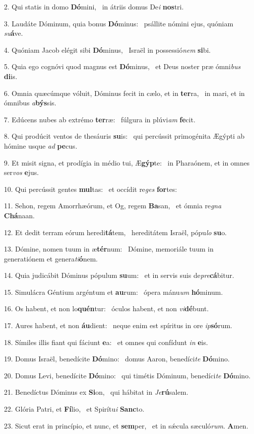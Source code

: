 2. Qui statis in domo \textbf{Dó}mini, \ast\  in átriis domus De\textit{i} \textbf{nos}tri.\

3. Laudáte Dóminum, quia bonus \textbf{Dó}minus: \ast\  psállite nómini ejus, quóniam \textit{su}\textbf{á}ve.\

4. Quóniam Jacob elégit sibi \textbf{Dó}minus, \ast\  Israël in possessió\textit{nem} \textbf{si}bi.\

5. Quia ego cognóvi quod magnus est \textbf{Dó}minus, \ast\  et Deus noster præ ómni\textit{bus} \textbf{di}is.\

6. Omnia quæcúmque vóluit, Dóminus fecit in cælo, et in \textbf{ter}ra, \ast\  in mari, et in ómnibus \textit{a}\textbf{býs}sis.\

7. Edúcens nubes ab extrémo \textbf{ter}ræ: \ast\  fúlgura in plúvi\textit{am} \textbf{fe}cit.\

8. Qui prodúcit ventos de thesáuris \textbf{su}is: \ast\  qui percússit primogénita Ægýpti ab hómine usque \textit{ad} \textbf{pe}cus.\

9. Et misit signa, et prodígia in médio tui, Æ\textbf{gýp}te: \ast\  in Pharaónem, et in omnes ser\textit{vos} \textbf{e}jus.\

10. Qui percússit gentes \textbf{mul}tas: \ast\  et occídit re\textit{ges} \textbf{for}tes:\

11. Sehon, regem Amorrhæórum, et Og, regem \textbf{Ba}san, \ast\  et ómnia re\textit{gna} \textbf{Chá}naan.\

12. Et dedit terram eórum heredi\textbf{tá}tem, \ast\  hereditátem Israël, pópu\textit{lo} \textbf{su}o.\

13. Dómine, nomen tuum in æ\textbf{tér}num: \ast\  Dómine, memoriále tuum in generatiónem et genera\textit{ti}\textbf{ó}nem.\

14. Quia judicábit Dóminus pópulum \textbf{su}um: \ast\  et in servis suis de\textit{pre}\textbf{cá}bitur.\

15. Simulácra Géntium argéntum et \textbf{au}rum: \ast\  ópera mánu\textit{um} \textbf{hó}minum.\

16. Os habent, et non lo\textbf{quén}tur: \ast\  óculos habent, et non \textit{vi}\textbf{dé}bunt.\

17. Aures habent, et non \textbf{áu}dient: \ast\  neque enim est spíritus in ore \textit{ip}\textbf{só}rum.\

18. Símiles illis fiant qui fáciunt \textbf{e}a: \ast\  et omnes qui confídunt \textit{in} \textbf{e}is.\

19. Domus Israël, benedícite \textbf{Dó}mino: \ast\  domus Aaron, benedíci\textit{te} \textbf{Dó}mino.\

20. Domus Levi, benedícite \textbf{Dó}mino: \ast\  qui timétis Dóminum, benedíci\textit{te} \textbf{Dó}mino.\

21. Benedíctus Dóminus ex \textbf{Si}on, \ast\  qui hábitat in \textit{Je}\textbf{rú}salem.\

22. Glória Patri, et \textbf{Fí}lio, \ast\  et Spirítu\textit{i} \textbf{Sanc}to.\

23. Sicut erat in princípio, et nunc, et \textbf{sem}per, \ast\  et in sǽcula sæculó\textit{rum}. \textbf{A}men.\

